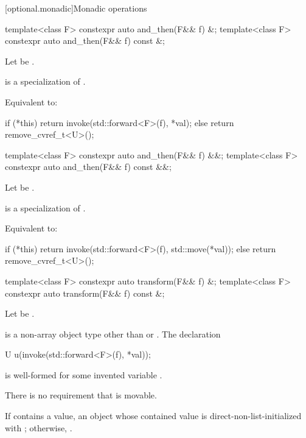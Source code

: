 [optional.monadic]{Monadic operations}

\begin{itemdecl}
template<class F> constexpr auto and_then(F&& f) &;
template<class F> constexpr auto and_then(F&& f) const &;
\end{itemdecl}

\begin{itemdescr}
\pnum
Let  be .

\pnum
\mandates
{} is a specialization of .

\pnum
\effects
Equivalent to:
\begin{codeblock}
if (*this) {
  return invoke(std::forward<F>(f), *val);
} else {
  return remove_cvref_t<U>();
}
\end{codeblock}
\end{itemdescr}

\begin{itemdecl}
template<class F> constexpr auto and_then(F&& f) &&;
template<class F> constexpr auto and_then(F&& f) const &&;
\end{itemdecl}

\begin{itemdescr}
\pnum
Let  be .

\pnum
\mandates
{} is a specialization of .

\pnum
\effects
Equivalent to:
\begin{codeblock}
if (*this) {
  return invoke(std::forward<F>(f), std::move(*val));
} else {
  return remove_cvref_t<U>();
}
\end{codeblock}
\end{itemdescr}

\begin{itemdecl}
template<class F> constexpr auto transform(F&& f) &;
template<class F> constexpr auto transform(F&& f) const &;
\end{itemdecl}

\begin{itemdescr}
\pnum
Let  be .

\pnum
\mandates
{} is a non-array object type
other than  or .
The declaration
\begin{codeblock}
U u(invoke(std::forward<F>(f), *val));
\end{codeblock}
is well-formed for some invented variable .
\begin{note}
There is no requirement that  is movable.
\end{note}

\pnum
\returns
If  contains a value, an  object
whose contained value is direct-non-list-initialized with
;
otherwise, .
\end{itemdescr}

